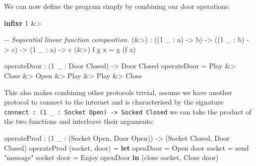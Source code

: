 \documentclass[
]{article}
\newenvironment{Shaded}{}{}
\newcommand{\CommentTok}[1]{\textcolor[rgb]{0.38,0.63,0.69}{\textit{#1}}}
\newcommand{\DataTypeTok}[1]{\textcolor[rgb]{0.56,0.13,0.00}{#1}}
\newcommand{\DecValTok}[1]{\textcolor[rgb]{0.25,0.63,0.44}{#1}}
\newcommand{\KeywordTok}[1]{\textcolor[rgb]{0.00,0.44,0.13}{\textbf{#1}}}
\newcommand{\NormalTok}[1]{#1}
\newcommand{\OperatorTok}[1]{\textcolor[rgb]{0.40,0.40,0.40}{#1}}
\newcommand{\OtherTok}[1]{\textcolor[rgb]{0.00,0.44,0.13}{#1}}
\newcommand{\StringTok}[1]{\textcolor[rgb]{0.25,0.44,0.63}{#1}}
\begin{document}
We can now define the program simply by combining our door operations:

\begin{Shaded}
\begin{Highlighting}[]
\KeywordTok{infixr} \DecValTok{1} \OperatorTok{\&\textgreater{}}

\CommentTok{{-}{-} Sequential linear function composition.}
\NormalTok{(}\OperatorTok{\&\textgreater{}}\NormalTok{) }\OperatorTok{:}\NormalTok{ ((}\DecValTok{1}\NormalTok{ \_ }\OperatorTok{:}\NormalTok{ a) }\OtherTok{{-}\textgreater{}}\NormalTok{ b) }\OtherTok{{-}\textgreater{}} 
\NormalTok{       ((}\DecValTok{1}\NormalTok{ \_ }\OperatorTok{:}\NormalTok{ b) }\OtherTok{{-}\textgreater{}}\NormalTok{ c) }\OtherTok{{-}\textgreater{}} 
\NormalTok{        (}\DecValTok{1}\NormalTok{ \_ }\OperatorTok{:}\NormalTok{ a) }\OtherTok{{-}\textgreater{}}\NormalTok{ c}
\NormalTok{(}\OperatorTok{\&\textgreater{}}\NormalTok{) f g x }\OtherTok{=}\NormalTok{ g (f x)}

\NormalTok{operateDoor }\OperatorTok{:}\NormalTok{ (}\DecValTok{1}\NormalTok{ \_ }\OperatorTok{:} \DataTypeTok{Door} \DataTypeTok{Closed}\NormalTok{) }\OtherTok{{-}\textgreater{}} \DataTypeTok{Door} \DataTypeTok{Closed}
\NormalTok{operateDoor }\OtherTok{=} \DataTypeTok{Play} \OperatorTok{\&\textgreater{}} \DataTypeTok{Close} \OperatorTok{\&\textgreater{}} \DataTypeTok{Open} \OperatorTok{\&\textgreater{}} \DataTypeTok{Play} \OperatorTok{\&\textgreater{}} \DataTypeTok{Play} \OperatorTok{\&\textgreater{}} \DataTypeTok{Close}
\end{Highlighting}
\end{Shaded}

This also makes combining other protocols trivial, assume we have
another protocol to connect to the internet and is characterised by the
signature
\texttt{connect\ :\ (1\ \_\ :\ Socket\ Open)\ -\textgreater{}\ Socked\ Closed}
we can take the product of the two functions and interleave their
arguments:

\begin{Shaded}
\begin{Highlighting}[]
\NormalTok{operateProd }\OperatorTok{:}\NormalTok{ (}\DecValTok{1}\NormalTok{ \_ }\OperatorTok{:}\NormalTok{ (}\DataTypeTok{Socket} \DataTypeTok{Open}\NormalTok{, }\DataTypeTok{Door} \DataTypeTok{Open}\NormalTok{)) }
           \OtherTok{{-}\textgreater{}}\NormalTok{ (}\DataTypeTok{Socket} \DataTypeTok{Closed}\NormalTok{, }\DataTypeTok{Door} \DataTypeTok{Closed}\NormalTok{)}
\NormalTok{operateProd (socket, door) }\OtherTok{=} 
  \KeywordTok{let}\NormalTok{ openDoor }\OtherTok{=} \DataTypeTok{Open}\NormalTok{ door}
\NormalTok{      socket\textquotesingle{} }\OtherTok{=}\NormalTok{ send }\StringTok{"message"}\NormalTok{ socket}
\NormalTok{      door\textquotesingle{} }\OtherTok{=} \DataTypeTok{Enjoy}\NormalTok{ openDoor }\KeywordTok{in}
\NormalTok{      (close socket\textquotesingle{}, }\DataTypeTok{Close}\NormalTok{ door\textquotesingle{})}
\end{Highlighting}
\end{Shaded}
\end{document}
